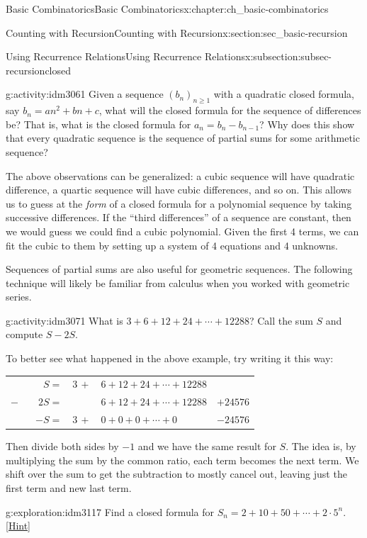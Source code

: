 \documentclass[oneside,10pt,]{book}
\numberwithin{equation}{chapter}
\newcommand{\hrulethin}  {\noalign{\hrule height 0.04em}}
\begin{document}
\begin{chapterptx}{Basic Combinatorics}{}{Basic Combinatorics}{}{}{x:chapter:ch_basic-combinatorics}
\begin{sectionptx}{Counting with Recursion}{}{Counting with Recursion}{}{}{x:section:sec_basic-recursion}
\begin{subsectionptx}{Using Recurrence Relations}{}{Using Recurrence Relations}{}{}{x:subsection:subsec-recursionclosed}
\begin{activity}{}{g:activity:idm3061}
Given a sequence \((b_n)_{n \ge 1}\) with a quadratic closed formula, say \(b_n = an^2 + bn + c\), what will the closed formula for the sequence of differences be?  That is, what is the closed formula for \(a_n = b_n - b_{n-1}\)?  Why does this show that every quadratic sequence is the sequence of partial sums for some arithmetic sequence?%
\end{activity}
The above observations can be generalized: a cubic sequence will have quadratic difference, a quartic sequence will have cubic differences, and so on.  This allows us to guess at the \emph{form} of a closed formula for a polynomial sequence by taking successive differences.  If the ``third differences'' of a sequence are constant, then we would guess we could find a cubic polynomial.  Given the first 4 terms, we can fit the cubic to them by setting up a system of 4 equations and 4 unknowns.%
\par
Sequences of partial sums are also useful for geometric sequences.  The following technique will likely be familiar from calculus when you worked with geometric series.%
\begin{activity}{}{g:activity:idm3071}%
What is \(3 + 6 + 12 + 24 + \cdots + 12288\)?  Call the sum \(S\) and compute \(S - 2S\).%
\end{activity}
To better see what happened in the above example, try writing it this way:%
\begin{sidebyside}{1}{0}{0}{0}%
\begin{sbspanel}{1}%
{\centering%
\begin{tabular}{rlll}
\(S=\)&\(3 \, +\)&\(6 + 12 + 24 + \cdots + 12288\)&\tabularnewline[0pt]
\(- \qquad 2S=\)&&\(6 + 12 + 24 + \cdots + 12288\)&\(+ 24576\)\tabularnewline\hrulethin
\(-S = \)&\(3 \, +\)&\(0 + 0 + 0 +  \cdots + 0 \)&\(-24576\)
\end{tabular}
\par}
\end{sbspanel}%
\end{sidebyside}%
\par
Then divide both sides by \(-1\) and we have the same result for \(S\). The idea is, by multiplying the sum by the common ratio, each term becomes the next term. We shift over the sum to get the subtraction to mostly cancel out, leaving just the first term and new last term.%
\begin{exploration}{}{g:exploration:idm3117}%
Find a closed formula for \(S_n = 2 + 10 + 50 + \cdots + 2\cdot 5^n\).%
\space\hspace*{0pt}\hfill{\tiny\hyperlink{g:hint:idm3121-back}{[Hint]}}\end{exploration}

\end{subsectionptx}
\end{sectionptx}
\end{chapterptx}
\end{document}
